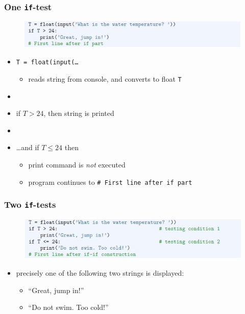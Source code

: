 \documentclass[english,14pt]{beamer}
\begin{document}

\begin{frame}[fragile]

\frametitle{One \texttt{if}-test}

\begin{figure}[ht]
	\centering
	\includegraphics[width=\textwidth]{figures/LLp68a}
\end{figure}
\vspace*{-3mm}
\begin{itemize}
	\item \texttt{T = float(input(\ldots}
	\begin{itemize}
		\item reads string from console, and converts to float \texttt{T}
	\end{itemize}
	\item[]
	\item if $T > 24$, then string is printed
	\item[]
	\item \ldots and if $T \leq  24$ then
	\begin{itemize}
		\item print command is \emph{not} executed
		\item program continues to \texttt{\# First line after if part}
	\end{itemize}
\end{itemize}

\end{frame}


\begin{frame}[fragile]

\frametitle{Two \texttt{if}-tests}

\begin{figure}[ht]
	\centering
	\includegraphics[width=\textwidth]{figures/LLp68b}
\end{figure}
\vspace*{-3mm}
\begin{itemize}
	\item precisely one of the following two strings is displayed:
	\begin{itemize}
		\item ``Great, jump in!''
		\item ``Do not swim. Too cold!''
	\end{itemize}
	
\end{itemize}

\end{frame}
\end{document}
